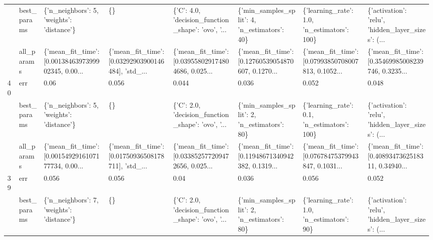 \begin{tabular}{llllllll}
   & best\_params &          \{'n\_neighbors': 5, 'weights': 'distance'\} &                                                 \{\} &  \{'C': 4.0, 'decision\_function\_shape': 'ovo', '... &       \{'min\_samples\_split': 4, 'n\_estimators': 40\} &        \{'learning\_rate': 1.0, 'n\_estimators': 100\} &  \{'activation': 'relu', 'hidden\_layer\_sizes': (... \\
   & all\_params &  \{'mean\_fit\_time': [0.0013846397399902345, 0.00... &  \{'mean\_fit\_time': [0.03292903900146484], 'std\_... &  \{'mean\_fit\_time': [0.039558029174804686, 0.025... &  \{'mean\_fit\_time': [0.12760539054870607, 0.1270... &  \{'mean\_fit\_time': [0.07993850708007813, 0.1052... &  \{'mean\_fit\_time': [0.35469985008239746, 0.3235... \\
40 & err &                                               0.06 &                                              0.056 &                                              0.044 &                                              0.036 &                                              0.052 &                                              0.048 \\
   & best\_params &          \{'n\_neighbors': 5, 'weights': 'distance'\} &                                                 \{\} &  \{'C': 2.0, 'decision\_function\_shape': 'ovo', '... &       \{'min\_samples\_split': 2, 'n\_estimators': 80\} &        \{'learning\_rate': 0.1, 'n\_estimators': 100\} &  \{'activation': 'relu', 'hidden\_layer\_sizes': (... \\
   & all\_params &  \{'mean\_fit\_time': [0.0015492916107177734, 0.00... &  \{'mean\_fit\_time': [0.01750936508178711], 'std\_... &  \{'mean\_fit\_time': [0.033852577209472656, 0.025... &  \{'mean\_fit\_time': [0.11948671340942382, 0.1319... &  \{'mean\_fit\_time': [0.07678475379943847, 0.1031... &  \{'mean\_fit\_time': [0.4089347362518311, 0.34940... \\
39 & err &                                              0.056 &                                              0.056 &                                               0.04 &                                              0.036 &                                              0.056 &                                              0.052 \\
   & best\_params &          \{'n\_neighbors': 7, 'weights': 'distance'\} &                                                 \{\} &  \{'C': 2.0, 'decision\_function\_shape': 'ovo', '... &       \{'min\_samples\_split': 2, 'n\_estimators': 80\} &         \{'learning\_rate': 1.0, 'n\_estimators': 90\} &  \{'activation': 'relu', 'hidden\_layer\_sizes': (... \\

\end{tabular}
